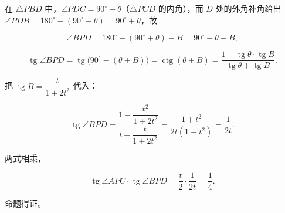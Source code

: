 \begin{answer}
在 $\triangle PBD$ 中，$\angle PDC=90^\circ-\theta$（$\triangle PCD$ 的内角），而 $D$ 处的外角补角给出 $\angle PDB=180^\circ-(90^\circ-\theta)=90^\circ+\theta$，故

\nopagebreak[4]
\[
\angle BPD=180^\circ-(90^\circ+\theta)-B=90^\circ-\theta-B,
\]

\nopagebreak[4]
\[
\operatorname{tg}\angle BPD
=\operatorname{tg}\bigl(90^\circ-(\theta+B)\bigr)
=\operatorname{ctg}(\theta+B)
=\frac{1-\operatorname{tg}\theta\cdot\operatorname{tg}B}{\operatorname{tg}\theta+\operatorname{tg}B}.
\]

把 $\operatorname{tg}B=\dfrac{t}{1+2t^2}$ 代入：

\nopagebreak[4]
\[
\operatorname{tg}\angle BPD
=\frac{1-\dfrac{t^2}{1+2t^2}}{t+\dfrac{t}{1+2t^2}}
=\frac{1+t^2}{2t(1+t^2)}
=\frac{1}{2t}.
\]

两式相乘，

\nopagebreak[4]
\[
\operatorname{tg}\angle APC\cdot\operatorname{tg}\angle BPD
=\frac{t}{2}\cdot\frac{1}{2t}
=\frac14.
\]

命题得证。


\end{answer}